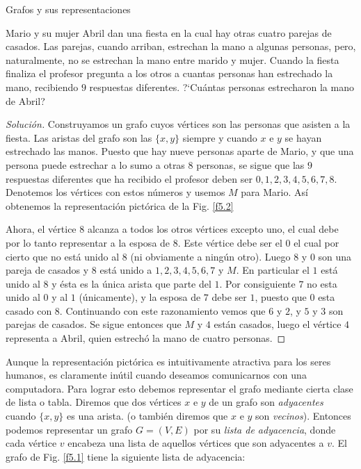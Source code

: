 \begin{section}{Grafos y sus representaciones}
\begin{ejemplo} Mario y su mujer Abril dan una
fiesta en la cual hay otras cuatro parejas de casados. Las
parejas, cuando arriban, estrechan la mano a algunas personas,
pero, naturalmente, no se estrechan la mano entre marido y mujer.
Cuando la fiesta finaliza el profesor pregunta a los otros a
cuantas personas han estrechado la mano, recibiendo $9$ respuestas
diferentes. ?`Cuántas personas estrecharon la mano de Abril?
\end{ejemplo}
\begin{proof}[Solución] Construyamos un grafo cuyos vértices son las personas que asisten a la
fiesta. Las aristas del grafo son las  $\{x,y\}$ siempre y cuando $x$ e $y$ se
hayan estrechado las manos. Puesto que hay nueve personas aparte
de Mario, y que una persona puede estrechar a lo sumo
a otras $8$ personas, se sigue que las $9$ respuestas diferentes que
ha recibido el profesor deben ser $0, 1, 2, 3, 4, 5, 6, 7, 8.$
Denotemos los vértices con estos números y usemos $M$ para Mario. Así obtenemos la representación pictórica de la Fig. \ref{f5.2}


Ahora, el vértice $8$ alcanza a todos los otros vértices excepto
uno, el cual debe por lo tanto representar a la esposa de $8$. Este
vértice debe ser el $0$ el cual por cierto que no está unido al $8$
(ni ob\-via\-men\-te a ningún otro). Luego $8$ y $0$ son una pareja de
casados y $8$ está unido a $1, 2, 3, 4, 5, 6, 7$ y $M$. En particular
el $1$ está unido al $8$ y ésta es la única arista que parte del $1$.
Por consiguiente $7$ no esta unido al $0$ y al $1$ (únicamente), y la
esposa de $7$ debe ser $1$, puesto que $0$ esta casado con $8$.
Continuando con este razonamiento vemos que $6$ y $2$, y $5$ y $3$ son
parejas de casados. Se sigue entonces que $M$ y $4$ están casados,
luego el vértice $4$ representa a Abril, quien estrechó la mano de
cuatro personas.
\end{proof}



Aunque la representación pictórica es intuitivamente atractiva
para los seres humanos, es claramente inútil cuando deseamos
comunicarnos con una computadora. Para lograr esto debemos
re\-pre\-sen\-tar el grafo mediante cierta clase de lista o tabla.
Diremos que dos vértices $x$ e $y$ de un grafo son {\em
adyacentes} cuando $\{x,y\}$ es una arista.
(o también diremos que $x$ e $y$ son {\em vecinos}).  Entonces
podemos representar un grafo $G=(V,E)$ por su {\em lista de
adyacencia},   donde cada vértice $v$
encabeza una lista de aquellos vértices que son adyacentes a $v$.
El grafo de Fig. \ref{f5.1} tiene la siguiente lista de
adyacencia:


\end{section}
